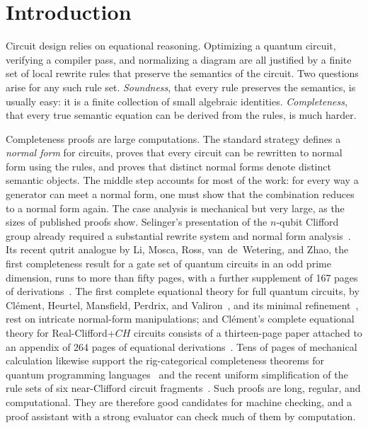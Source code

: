 \section{Introduction}\label{sec:intro}

Circuit design relies on equational reasoning.  Optimizing a quantum
circuit, verifying a compiler pass, and normalizing a diagram are all
justified by a finite set of local rewrite rules that preserve the
semantics of the circuit.  Two questions arise for any such rule set.
\emph{Soundness}, that every rule preserves the semantics, is usually easy:
it is a finite collection of small algebraic identities.
\emph{Completeness}, that every true semantic equation can be derived from
the rules, is much harder.

Completeness proofs are large computations.  The standard strategy defines
a \emph{normal form} for circuits, proves that every circuit can be rewritten
to normal form using the rules, and proves that distinct normal forms denote
distinct semantic objects.  The middle step accounts for most of the work:
for every way a generator can meet a normal form, one must
show that the combination reduces to a normal form again.  The case
analysis is mechanical but very large, as the sizes of published proofs
show.  Selinger's presentation of the $n$-qubit Clifford group already
required a substantial rewrite system and normal form
analysis~\cite{selinger2015clifford}.  Its recent qutrit
analogue by Li, Mosca, Ross, van~de~Wetering, and Zhao, the first
completeness result for a gate set of quantum circuits in an odd prime
dimension, runs to more than fifty pages, with a further supplement of
167 pages of derivations~\cite{li2025qutrit}.  The first complete equational theory for full
quantum circuits, by Cl\'ement, Heurtel, Mansfield, Perdrix, and
Valiron~\cite{clement2023complete}, and its minimal
refinement~\cite{clement2024minimal}, rest on intricate normal-form
manipulations; and Cl\'ement's complete equational theory for
Real-Clifford+$CH$ circuits consists of a thirteen-page paper attached to an
appendix of 264 pages of equational
derivations~\cite{clement2026realcliffordch}.  Tens of pages of mechanical
calculation likewise support the
rig-categorical completeness theorems for quantum programming
languages~\cite{carette2024squareroots,fang2026hadamard} and the
recent uniform simplification of the rule sets of six near-Clifford circuit
fragments~\cite{blake2026simpler}.  Such proofs are long, regular, and
computational.  They are therefore good candidates for machine checking,
and a proof assistant with a strong evaluator can check much of them by
computation.

